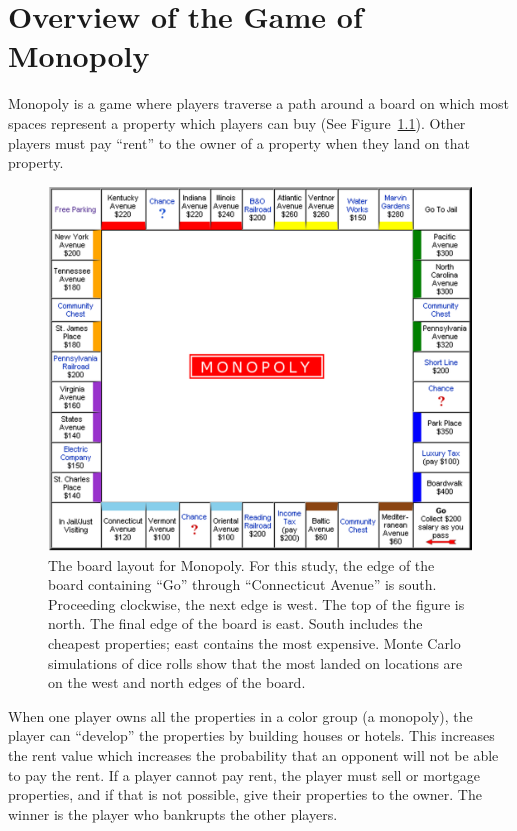 \clearpage
\chapter{Overview of the Game of Monopoly}\label{chap:monopoly}

Monopoly is a game where players traverse a path around a board on which most
spaces represent a property which players can buy (See
Figure~\ref{figure-monoboard}). Other players must pay ``rent'' to the owner of
a property when they land on that property.

\begin{figure}[htp]
\centerline{\includegraphics[width=1.0\columnwidth]{Figures/Monopoly.png}}
\caption[Board layout for Monopoly]{The board layout for Monopoly. For this
study, the edge of the board containing ``Go'' through ``Connecticut Avenue'' is
south. Proceeding clockwise, the next edge is west. The top of the figure is
north. The final edge of the board is east. South includes the cheapest
properties; east contains the most expensive. Monte Carlo simulations of dice
rolls show that the most landed on locations are on the west and north edges of
the board.}
\label{figure-monoboard}
\end{figure}

When one player owns all the properties in a color group (a monopoly), the
player can ``develop'' the properties by building houses or hotels. This
increases the rent value which increases the probability that an opponent will
not be able to pay the rent. If a player cannot pay rent, the player must sell
or mortgage properties, and if that is not possible, give their properties to
the owner. The winner is the player who bankrupts the other players.

